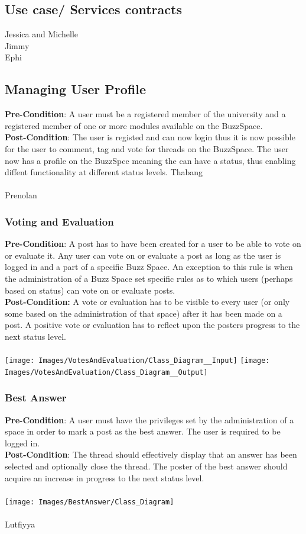\documentclass[a4paper,11pt]{article}
\begin{document}
\subsection{Use case/ Services contracts}
Jessica and Michelle\\
Jimmy\\
Ephi\\
\subsection{Managing User Profile}
\textbf{Pre-Condition}: A user must be a registered member of the university and a registered member of one or more modules available on the BuzzSpace.
\\
\textbf{Post-Condition}: The user is registed and can now login thus it is now possible for the user to comment, tag and vote for threads on the BuzzSpace. The user now has a profile on the BuzzSpce meaning the can have a status, thus enabling diffent functionality at different status levels.
Thabang\\
\\
Prenolan
\subsubsection{Voting and Evaluation}
\textbf{Pre-Condition}: A post has to have been created for a user to be able to vote on or evaluate it. Any user can vote on or evaluate a post as long as the user is logged in and a part of a specific Buzz Space. An exception to this rule is when the administration of a Buzz Space set specific rules as to which users (perhaps based on status) can vote on or evaluate posts.
\\
\textbf{Post-Condition:} A vote or evaluation has to be visible to every user (or only some based on the administration of that space) after it has been made on a post. A positive vote or evaluation has to reflect upon the posters progress to the next status level.
\\
\\
\texttt{[image: Images/VotesAndEvaluation/Class\_Diagram\_\_Input]}
\texttt{[image: Images/VotesAndEvaluation/Class\_Diagram\_\_Output]}
\\
\subsubsection{Best Answer}
\textbf{Pre-Condition}: A user must have the privileges set by the administration of a space in order to mark a post as the best answer. The user is required to be logged in.
\\
\textbf{Post-Condition}: The thread should effectively display that an answer has been selected and optionally close the thread. The poster of the best answer should acquire an increase in progress to the next status level.
\\
\\
\texttt{[image: Images/BestAnswer/Class\_Diagram]}
\\
\\
Lutfiyya\\
\end{document}
